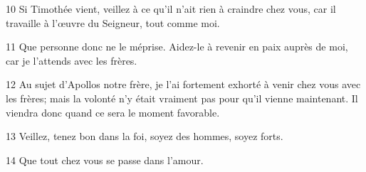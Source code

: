 
10 Si Timothée vient, veillez à ce qu’il n’ait rien à craindre chez vous, car il travaille à l’œuvre du Seigneur, tout comme moi.

11 Que personne donc ne le méprise. Aidez-le à revenir en paix auprès de moi, car je l’attends avec les frères.

12 Au sujet d’Apollos notre frère, je l’ai fortement exhorté à venir chez vous avec les frères; mais la volonté n’y était vraiment pas pour qu’il vienne maintenant. Il viendra donc quand ce sera le moment favorable.

13 Veillez, tenez bon dans la foi, soyez des hommes, soyez forts.

14 Que tout chez vous se passe dans l’amour.